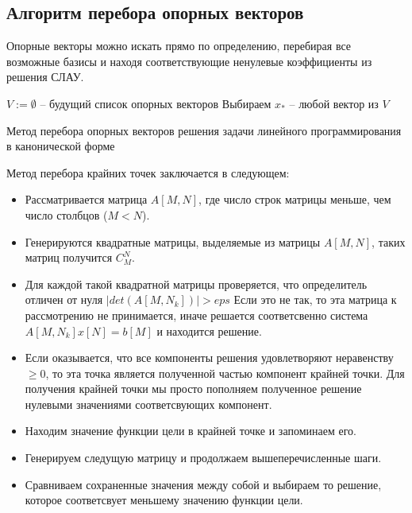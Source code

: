 \documentclass[../body.tex]{subfiles}
\begin{document}
	\subsection{Алгоритм перебора опорных векторов}
	Опорные векторы можно искать прямо по определению, перебирая все возможные базисы и находя соответствующие ненулевые коэффициенты из решения СЛАУ. 
	\vspace{\baselineskip}
	
	\begin{algorithm}[H]\label{points}
		$V:=\emptyset$ -- будущий список опорных векторов\;
		Выбираем $x_*$  -- любой вектор из $V$\;
		
		\caption{Метод перебора опорных векторов решения задачи линейного программирования в канонической форме}
	\end{algorithm}
	\vspace{\baselineskip}
	
	Метод перебора крайних точек заключается в следующем:
	\begin{itemize}
		\item Рассматривается матрица $ A[M,N] $, где число строк матрицы меньше, чем число столбцов ($M<N$).
		\item Генерируются квадратные матрицы, выделяемые из матрицы  $ A[M,N] $, таких матриц получится $C_M^N$.
		\item Для каждой такой квадратной матрицы проверяется, что определитель отличен от нуля $|det(A[M,N_k])| > eps$
		Если это не так, то эта матрица к рассмотрению не принимается, иначе решается соответсвенно система $ A[M, N_k]x[N]=b[M] $ и находится решение.
		\item Если оказывается, что все компоненты решения удовлетворяют неравенству $\geq 0 $, то эта точка является полученной частью компонент крайней точки. Для получения крайней точки мы просто пополняем полученное решение нулевыми значениями соответсвующих компонент.
		\item Находим значение функции цели в крайней точке и запоминаем его.
		\item Генерируем следущую матрицу и продолжаем вышеперечисленные шаги.
		\item Сравниваем сохраненные значения между собой и выбираем то решение, которое соответсвует меньшему значению функции цели.	
	\end{itemize}	
\end{document}
